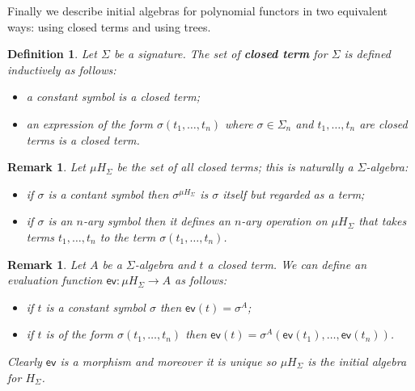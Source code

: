 \documentclass[letterpaper, 11pt, oneside]{memoir}
\theoremstyle{myteo}
\newtheorem{definition}[theorem]{Definition}
\newtheorem{remark}[theorem]{Remark}
\numberwithin{equation}{section}
\newcommand{\marginnote}[1]{\marginpar{\footnotesize #1}}
\begin{document}
Finally we describe initial algebras for polynomial functors in two equivalent ways: using closed terms and using trees.

\begin{definition}
  Let \(\Sigma\) be a signature.
  The set of \textbf{closed term} for \(\Sigma\) is defined inductively as follows:
  \marginnote{closed term}
  \begin{itemize}
  \item[1.] a constant symbol is a closed term;
  \item[2.] an expression of the form \(\sigma(t_1, \ldots, t_n)\) where \(\sigma \in \Sigma_n\) and \(t_1, \ldots, t_n\) are closed terms is a closed term.
  \end{itemize}
\end{definition}

\begin{remark}
  Let \(\mu H_\Sigma\) be the set of all closed terms; this is naturally a \(\Sigma\)-algebra:
  \begin{itemize}
  \item[1.] if \(\sigma\) is a contant symbol then \(\sigma^{\mu H_\Sigma}\) is \(\sigma\) itself but regarded as a term;
  \item[2.] if \(\sigma\) is an \(n\)-ary symbol then it defines an \(n\)-ary operation on \(\mu H_\Sigma\) that takes terms \(t_1, \ldots, t_n\) to the term \(\sigma(t_1, \ldots, t_n)\).
  \end{itemize}
\end{remark}

\begin{remark}
  \label{rem:ev_function}
  Let \(A\) be a \(\Sigma\)-algebra and \(t\) a closed term.
  We can define an evaluation function \(\textsf{ev} \colon \mu H_\Sigma \to A\) as follows:
  \begin{itemize}
  \item[1.] if \(t\) is a constant symbol \(\sigma\) then \(\textsf{ev}(t) = \sigma^A\);
  \item[2.] if \(t\) is of the form \(\sigma(t_1, \ldots, t_n)\) then \(\textsf{ev}(t) = \sigma^A(\textsf{ev}(t_1), \ldots, \textsf{ev}(t_n))\).
  \end{itemize}
  Clearly \(\textsf{ev}\) is a morphism and moreover it is unique so \(\mu H_\Sigma\) is the initial algebra for \(H_\Sigma\).
\end{remark}
\end{document}
